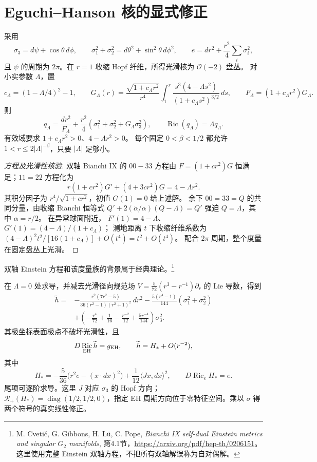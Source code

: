 \documentclass[UTF8,fontset=fandol,zihao=-4,oneside,openany]{ctexbook}
\theoremstyle{cjkplain}
\numberwithin{equation}{chapter}
\DeclareMathOperator{\Ric}{Ric}
\begin{document}
\section{Eguchi--Hanson 核的显式修正}
采用
\[
\sigma_3=d\psi+\cos\theta\,d\phi,\qquad
\sigma_1^2+\sigma_2^2=d\theta^2+\sin^2\theta\,d\phi^2,\qquad
e=dr^2+\frac{r^2}{4}\sum_i\sigma_i^2,
\]
且 \(\psi\) 的周期为 \(2\pi\)。在 \(r=1\) 收缩 Hopf 纤维，所得光滑核为 \(\mathcal O(-2)\) 盘丛。
对小实参数 \(\Lambda\)，置
\[
c_\Lambda=(1-\Lambda/4)^2-1,\qquad
G_\Lambda(r)=\frac{\sqrt{1+c_\Lambda r^2}}{r^4}
\int_1^r\frac{s^3(4-\Lambda s^2)}
{(1+c_\Lambda s^2)^{3/2}}\,ds,\qquad
F_\Lambda=(1+c_\Lambda r^2)G_\Lambda.
\]
则
\begin{equation}\label{FND:exactcore}
q_\Lambda=\frac{dr^2}{F_\Lambda}
+\frac{r^2}{4}
(\sigma_1^2+\sigma_2^2+G_\Lambda\sigma_3^2),
\qquad \Ric(q_\Lambda)=\Lambda q_\Lambda .
\end{equation}
有效域要求 \(1+c_\Lambda r^2>0\)、\(4-\Lambda r^2>0\)。
每个固定 \(0<\beta<1/2\) 都允许
\(1<r\le2|\Lambda|^{-\beta}\)，只要 \(|\Lambda|\) 足够小。

\begin{proof}[方程及光滑性核验]
双轴 Bianchi IX 的 \(00-33\) 方程由
\(F=(1+cr^2)G\) 恒满足；\(11=22\) 方程化为
\[
r(1+cr^2)G'+(4+3cr^2)G=4-\Lambda r^2.
\]
其积分因子为 \(r^4/\sqrt{1+cr^2}\)，初值 \(G(1)=0\) 给上述解。
余下 \(00=33=Q\) 的共同分量，由收缩 Bianchi 恒等式
\(Q'+2(\dot\alpha/\alpha)(Q-\Lambda)=Q'\) 强迫 \(Q=\Lambda\)，其中 \(\alpha=r/2\)。
在异常球面附近，
\(F'(1)=4-\Lambda\)、
\(G'(1)=(4-\Lambda)/(1+c_\Lambda)\)；
测地距离 \(t\) 下收缩纤维系数为
\((4-\Lambda)^2t^2/[16(1+c_\Lambda)]+O(t^4)=t^2+O(t^4)\)。
配合 \(2\pi\) 周期，整个度量在固定盘丛上光滑。
\end{proof}
双轴 Einstein 方程和该度量族的背景属于经典理论。\footnote{M. Cvetič, G. Gibbons, H. Lü, C. Pope, \emph{Bianchi IX self-dual Einstein metrics and singular \(G_2\) manifolds}, 第4.1节，\url{https://arxiv.org/pdf/hep-th/0206151}。这里使用完整 Einstein 双轴方程，不把所有双轴解误称为自对偶解。}

在 \(\Lambda=0\) 处求导，并减去光滑径向规范场
\(V=\frac5{72}(r^3-r^{-1})\partial_r\) 的 Lie 导数，得到
\[
\begin{aligned}
\widetilde h={}&-\frac{r^2(7r^2-5)}{36(r^2-1)(r^2+1)^2}\,dr^2
-\frac{5(r^4-1)}{144}(\sigma_1^2+\sigma_2^2)\\
&+\left(-\frac{r^4}{72}+\frac1{16}
-\frac{r^{-2}}{12}+\frac{5r^{-4}}{144}\right)\sigma_3^2 .
\end{aligned}
\]
其极坐标表面极点不破坏光滑性，且
\[
D\Ric_{\rm EH}\widetilde h=g_{\rm EH},\qquad
\widetilde h=H_*+O(r^{-2}),
\]
其中
\begin{equation}\label{FND:Hstar}
H_*=-\frac5{36}\bigl(r^2e-(x\cdot dx)^2\bigr)
+\frac1{12}\langle Jx,dx\rangle^2,\qquad
D\Ric_eH_*=e.
\end{equation}
尾项可逐阶求导。这里 \(J\) 对应 \(\sigma_3\) 的 Hopf 方向；
\(\mathcal R_+(H_*)=\operatorname{diag}(1/2,1/2,0)\)，指定 EH 周期方向位于零特征空间。乘以 \(\sigma\) 得两个符号的真实线性修正。
\end{document}

